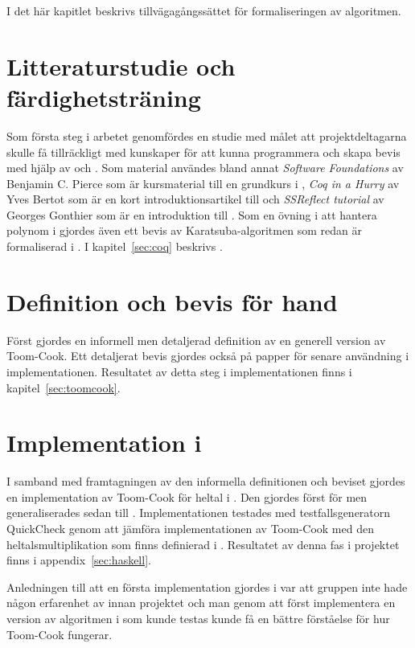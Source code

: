 I det här kapitlet beskrivs tillvägagångssättet för formaliseringen av algoritmen.

\section{Litteraturstudie och färdighetsträning}
Som första steg i arbetet genomfördes en studie med målet att projektdeltagarna
skulle få tillräckligt med kunskaper för att kunna programmera och skapa bevis
med hjälp av \coq{} och \ssr{}. Som material användes bland annat
\emph{Software Foundations} av Benjamin C. Pierce som är kursmaterial till en
grundkurs i \coq{}\cite{pierce2012software}, \emph{Coq in a Hurry} av Yves
Bertot som är en kort introduktionsartikel till \coq{}\cite{bertot2006coq} och
\emph{SSReflect tutorial} av Georges Gonthier som är en introduktion till
\ssr{} \cite{gonthier2009ssreflect}. Som en övning i att hantera polynom i \ssr
gjordes även ett bevis av Karatsuba-algoritmen som redan är formaliserad i
\coq{}. I kapitel~\ref{sec:coq} beskrivs \coq.

\section{Definition och bevis för hand}
Först gjordes en informell men detaljerad definition av en generell version av
Toom-Cook. Ett detaljerat bevis gjordes också på papper för senare användning i
implementationen. Resultatet av detta steg i implementationen finns i
kapitel~\ref{sec:toomcook}.

\section{Implementation i \haskell{}}
I samband med framtagningen av den informella definitionen och beviset gjordes
en implementation av Toom-Cook för heltal i \haskell{}. Den gjordes först för
 men generaliserades sedan till . Implementationen testades
med testfallsgeneratorn QuickCheck genom att jämföra implementationen av
Toom-Cook med den heltalsmultiplikation som finns definierad i \haskell{}.
Resultatet av denna fas i projektet finns i appendix~\ref{sec:haskell}.

Anledningen till att en första implementation gjordes i \haskell{} var att
gruppen inte hade någon erfarenhet av \coq{} innan projektet och man genom att
först implementera en version av algoritmen i \haskell{} som kunde testas
kunde få en bättre förståelse för hur Toom-Cook fungerar.


